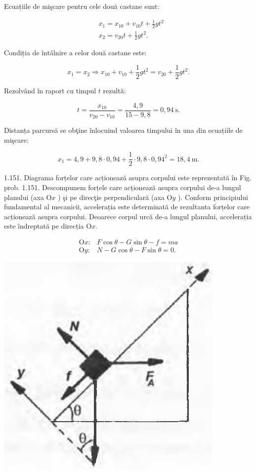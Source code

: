 \documentclass[10pt]{article}
\begin{document}
Ecuațiile de mişcare pentru cele două castane sunt:

$$
\begin{aligned}
& x_{1}=x_{10}+v_{10} t+\frac{1}{2} g t^{2} \\
& x_{2}=v_{20} t+\frac{1}{2} g t^{2} .
\end{aligned}
$$

Condiția de întâlnire a celor două castane este:

$$
x_{1}=x_{2} \Rightarrow x_{10}+v_{10}+\frac{1}{2} g t^{2}=v_{20}+\frac{1}{2} g t^{2} .
$$

Rezolvând în raport cu timpul $t$ rezultă:

$$
t=\frac{x_{10}}{v_{20}-v_{10}}=\frac{4,9}{15-9,8}=0,94 \mathrm{~s} .
$$

Distanța parcursă se obţine înlocuind valoarea timpului în una din ecuațiile de mişcare:

$$
x_{1}=4,9+9,8 \cdot 0,94+\frac{1}{2} \cdot 9,8 \cdot 0,94^{2}=18,4 \mathrm{~m} .
$$

1.151. Diagrama forțelor care acționează asupra corpului este reprezentată în Fig. prob. 1.151. Descompunem forțele care acționează asupra corpului de-a lungul planului (axa $\mathrm{O} x$ ) şi pe direcţie perpendiculară (axa $\mathrm{O} y$ ). Conform principiului fundamental al mecanicii, accelerația este determinatã de rezultanta forțelor care acționează asupra corpului. Deoarece corpul urcă de-a lungul planului, accelerația este îndreptată pe direcția $\mathrm{O} x$.

$$
\begin{array}{ll}
\mathrm{O} x: & F \cos \theta-G \sin \theta-f=m a \\
\mathrm{O} y: & N-G \cos \theta-F \sin \theta=0 .
\end{array}
$$

\begin{center}
\includegraphics[max width=\textwidth]{2025_07_01_5b3ff9fa0d508c8e9f17g-231}
\end{center}
\end{document}
